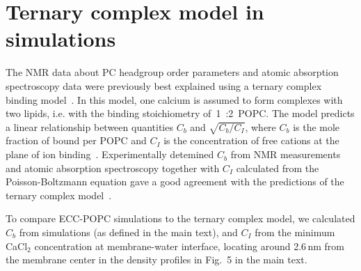 \documentclass[journal=jpcbfk]{achemso}
\begin{document}
\section{Ternary complex model in simulations}
The NMR data about PC headgroup order parameters
and atomic absorption spectroscopy data were previously
best explained using a ternary complex binding model~\cite{altenbach84}.
In this model, one calcium is assumed to form
complexes with two lipids, i.e. with the binding stoichiometry of~1~:2~POPC.
The model predicts a linear relationship between quantities 
$C_b$ and $\sqrt{C_b/C_I}$, where $C_b$ is the
mole fraction of bound  per POPC
and $C_I$ is the concentration of free cations at the plane of ion binding~\cite{altenbach84}.
Experimentally detemined $C_b$ %
from NMR measurements and atomic absorption spectroscopy %
together with $C_I$ calculated from the Poisson-Boltzmann equation
gave a good agreement with the predictions of the
ternary complex model~\cite{altenbach84}.

To compare ECC-POPC simulations to the ternary complex model,
we calculated $C_b$ from simulations (as defined in the main text),
and $C_I$ from the minimum CaCl$_2$ concentration at membrane-water interface,
locating around 2.6\,nm from the membrane center in
the density profiles in Fig.~5 in the main text. 
\end{document}

